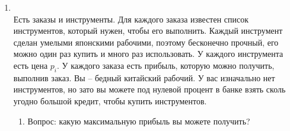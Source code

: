 \begin{enumerate}
\begin{enumerate}
      \item $\O(E)$ при условии, что нам уже известен максимальный поток (сам поток, не только его величина).

        \textbf{Решение:}

        \begin{itemize}
          \item Так как нам дан сам поток, остаточный граф $G_f$ можно построить за $O(E)$:
          для каждого ребра $(u \to v)$ с пропускной способностью $c$ и потоком $f$:
          \begin{itemize}
            \item если $f < c$: добавляем прямое остаточное ребро $(u \to v)$ с остатком $c - f$,
            \item если $f > 0$: добавляем обратное остаточное ребро $(v \to u)$ с остатком $f$.
          \end{itemize}

          \item Вычисляем $A$: обход (DFS/BFS) из $s$ по $G_f$ за $O(V + E)$.

          \item Вычисляем $B$: обход (DFS/BFS) из $t$ по рёбрам $G_f$, взятым в обратном направлении, за $O(V + E)$; берём дополнение.

          \item Отвечаем: единственный разрез $\Leftrightarrow$ $A = B$. Проверка равенства двух множеств за $O(V)$.

          \item Итоговая сложность: $O(E)$ (построение $G_f$ + два обхода + сравнение).
        \end{itemize}
    \end{enumerate}

  \item {} \\
    Есть заказы и инструменты. Для каждого заказа известен список инструментов, который
    нужен, чтобы его выполнить.
    Каждый инструмент сделан умелыми японскими рабочими, поэтому бесконечно прочный,
    его можно один раз купить и много раз использовать.
    У каждого инструмента есть цена $p_i$.
    У каждого заказа есть прибыль, которую можно получить, выполнив заказ.
    Вы -- бедный китайский рабочий. У вас изначально нет инструментов, но зато вы можете под нулевой процент в банке взять
    сколь угодно большой кредит, чтобы купить инструментов.
    \begin{enumerate}
      \item
        Вопрос: какую максимальную прибыль вы можете получить?


\end{enumerate}
\end{enumerate}
